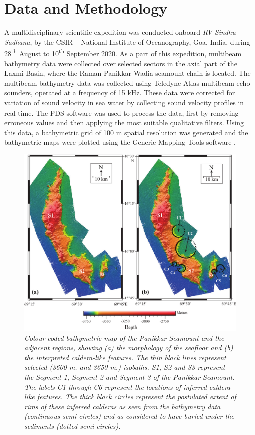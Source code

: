 \documentclass[twocolumn]{article}
\begin{document}
\section{Data and Methodology}
A multidisciplinary scientific expedition was conducted onboard \textit{RV Sindhu Sadhana}, by the CSIR – National Institute of Oceanography, Goa, India, during 28\textsuperscript{th} August to 10\textsuperscript{th} September 2020. As a part of this expedition, multibeam bathymetry data were collected over selected sectors in the axial part of the Laxmi Basin, where the Raman-Panikkar-Wadia seamount chain is located. The multibeam bathymetry data was collected using Teledyne-Atlas multibeam echo sounders, operated at a frequency of 15 kHz. These data were corrected for variation of sound velocity in sea water by collecting sound velocity profiles in real time. The PDS software was used to process the data, first by removing erroneous values and then applying the most suitable qualitative filters. Using this data, a bathymetric grid of 100 m spatial resolution was generated and the bathymetric maps were plotted using the Generic Mapping Tools software \citep{Wessel2019}.
\begin{figure}[!htb]
	\centering
	\includegraphics[width=\textwidth]{panikkar-seamount.pdf}
	\caption{
		\textsl{Colour-coded bathymetric map of the Panikkar Seamount and the adjacent regions, showing (a) the morphology of the seafloor and (b) the interpreted caldera-like features. The thin black lines represent selected (3600 m. and 3650 m.) isobaths. S1, S2 and S3 represent the Segment-1, Segment-2 and Segment-3 of the Panikkar Seamount. The labels C1 through C6 represent the locations of inferred caldera-like features. The thick black circles represent the postulated extent of rims of these inferred calderas as seen from the bathymetry data (continuous semi-circles) and as considered to have buried under the sediments (dotted semi-circles).}
	}
	\label{panikkar}
\end{figure}
\end{document}
